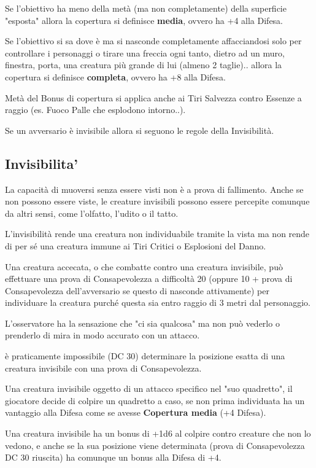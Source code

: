 \documentclass[a4paper,11pt,twoside,openany]{book}
\begin{document}
Se l'obiettivo ha meno della metà (ma non completamente) della superficie "esposta" allora la copertura si definisce \textbf{media}, ovvero ha +4 alla Difesa.

Se l'obiettivo si sa dove è ma si nasconde completamente affacciandosi solo per controllare i personaggi o tirare una freccia ogni tanto, dietro ad un muro, finestra, porta, una creatura più grande di lui (almeno 2 taglie).. allora la copertura si definisce \textbf{completa}, ovvero ha +8 alla Difesa.

Metà del Bonus di copertura si applica anche ai Tiri Salvezza contro Essenze a raggio (es. Fuoco Palle che esplodono intorno..).

Se un avversario è invisibile allora si seguono le regole della Invisibilità.

\subsection{Invisibilita'}

\label{invisibilita}

La capacità di muoversi senza essere visti non è a prova di fallimento. Anche se non possono essere viste, le creature invisibili possono essere percepite comunque da altri sensi, come l'olfatto, l'udito o il tatto.

L'invisibilità rende una creatura non individuabile tramite la vista ma non rende di per sé una creatura immune ai Tiri Critici o Esplosioni del Danno.

Una creatura accecata, o che combatte contro una creatura invisibile, può effettuare una prova di Consapevolezza a difficoltà 20 (oppure 10 + prova di Consapevolezza dell'avversario se questo di nasconde attivamente) per individuare la creatura purché questa sia entro raggio di 3 metri dal personaggio.

L'osservatore ha la sensazione che "ci sia qualcosa" ma non può vederlo o prenderlo di mira in modo accurato con un attacco.

è praticamente impossibile (DC 30) determinare la posizione esatta di una creatura invisibile con una prova di Consapevolezza.

Una creatura invisibile oggetto di un attacco specifico nel "suo quadretto", il giocatore decide di colpire un quadretto a caso, se non prima individuata ha un vantaggio alla Difesa come se avesse \textbf{Copertura media} (+4 Difesa).

Una creatura invisibile ha un bonus di +1d6 al colpire contro creature che non lo vedono, e anche se la sua posizione viene determinata (prova di Consapevolezza DC 30 riuscita) ha comunque un bonus alla Difesa di +4.
\end{document}
